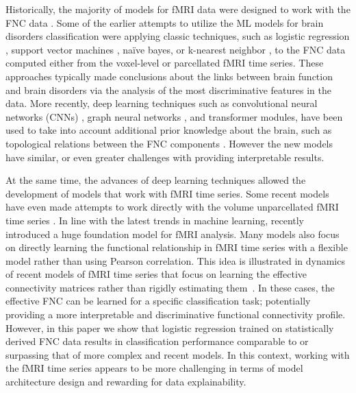 \documentclass[final,5p,times,twocolumn,authoryear]{elsarticle}
\begin{document}
Historically, the majority of models for fMRI data were designed to work with the FNC data \citep{ml_in_fmri, cecchi_early_model, shen_early_model, mohammad_early_paper}. Some of the earlier attempts to utilize the ML models for brain disorders classification were applying classic techniques, such as logistic regression \citep{lr}, support vector machines \citep{svm}, naïve bayes, or k-nearest neighbor \citep{knn}, to the FNC data computed either from the voxel-level or parcellated fMRI time series. These approaches typically made conclusions about the links between brain function and brain disorders via the analysis of the most discriminative features in the data. More recently, deep learning techniques such as convolutional neural networks (CNNs) \citep{brainnetcnn}, graph neural networks \citep{fbnetgen}, and transformer \citep{bnt} modules, have been used to take into account additional prior knowledge about the brain, such as topological relations between the FNC components \citep{brainnetcnn, com_tf}. However the new models have similar, or even greater challenges with providing interpretable results.

At the same time, the advances of deep learning techniques allowed the development of models that work with fMRI time series. Some recent models have even made attempts to work directly with the volume unparcellated fMRI time series \citep{4Dmodel, tff, swiFT}. In line with the latest trends in machine learning, \citet{brainlm} recently introduced a huge foundation model for fMRI analysis. Many models also focus on directly learning the functional relationship in fMRI time series with a flexible model rather than using Pearson correlation. This idea is illustrated in dynamics of recent models of fMRI time series that focus on learning the effective connectivity matrices rather than rigidly estimating them~\citep{mahmood2021brain, fbnetgen, dice, mahmood2023glacier}. In these cases, the effective FNC can be learned for a specific classification task; potentially providing a more interpretable and discriminative functional connectivity profile. However, in this paper we show that logistic regression trained on statistically derived FNC data results in classification performance comparable to or surpassing that of more complex and recent models. In this context, working with the fMRI time series appears to be more challenging in terms of model architecture design and rewarding for data explainability.
\end{document}
